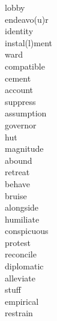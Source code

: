 \documentclass[a4paper, 11pt]{ctexart}
\begin{document}
\begin{multicols*}{3}
\begin{description}
\item[lobby]

\item[endeavo(u)r]

\item[identity]

\item[instal(l)ment]

\item[ward]

\item[compatible]

\item[cement]

\item[account]

\item[suppress]

\item[assumption]

\item[governor]

\item[hut]

\item[magnitude]

\item[abound]

\item[retreat]

\item[behave]

\item[bruise]

\item[alongside]

\item[humiliate]

\item[conspicuous]

\item[protest]

\item[reconcile]

\item[diplomatic]

\item[alleviate]

\item[stuff]

\item[empirical]

\item[restrain]


\end{description}
\end{multicols*}
\end{document}

